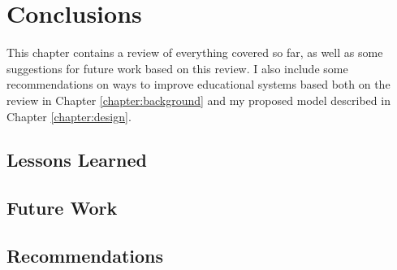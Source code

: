 \chapter{Conclusions}
\label{chapter:conclusions}
  This chapter contains a review of everything covered so far, as well as some suggestions for future work based on this review. I also include some recommendations on ways to improve educational systems based both on the review in Chapter \ref{chapter:background} and my proposed model described in Chapter \ref{chapter:design}.

  \section{Lessons Learned}
  \section{Future Work}
  \section{Recommendations}
